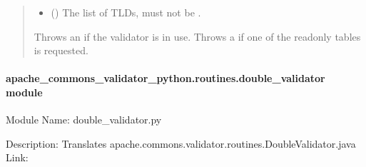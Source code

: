 \documentclass[letterpaper,10pt,english]{sphinxmanual}
\begin{document}
\begin{fulllineitems}
\begin{fulllineitems}
\begin{quote}
\begin{description}
\begin{itemize}
\item {} 
\sphinxAtStartPar
{} (\sphinxstyleliteralemphasis{\sphinxupquote{{[}}}\sphinxstyleliteralemphasis{\sphinxupquote{{]}}}) \textendash{} The list of TLDs, must not be .

\end{itemize}

\sphinxAtStartPar
Throws an  if the validator is in use.
Throws a  if one of the read\sphinxhyphen{}only tables is requested.

\end{description}\end{quote}

\end{fulllineitems}


\end{fulllineitems}



\paragraph{apache\_commons\_validator\_python.routines.double\_validator module}
\label{\detokenize{apache_commons_validator_python.routines:module-apache_commons_validator_python.routines.double_validator}}\label{\detokenize{apache_commons_validator_python.routines:apache-commons-validator-python-routines-double-validator-module}}
\sphinxAtStartPar
Module Name: double\_validator.py

\sphinxAtStartPar
Description: Translates apache.commons.validator.routines.DoubleValidator.java
Link: 
\end{document}
